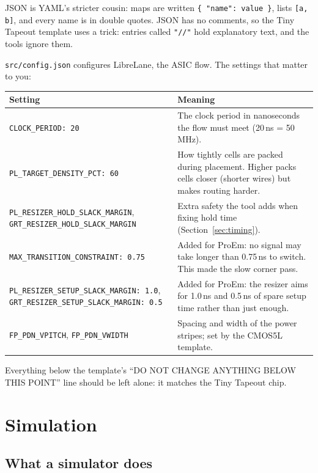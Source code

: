 \documentclass[11pt,a4paper]{article}
\newcommand{\file}[1]{\texttt{#1}}
\begin{document}
JSON is YAML's stricter cousin: maps are written \texttt{\{ "name": value \}}, lists \texttt{[a, b]}, and every name is in double quotes. JSON has no comments, so the Tiny Tapeout template uses a trick: entries called \texttt{"//"} hold explanatory text, and the tools ignore them.

\file{src/config.json} configures LibreLane, the ASIC flow. The settings that matter to you:

\begin{center}
\begin{tabularx}{\linewidth}{@{}lX@{}}
\toprule
Setting & Meaning \\
\midrule
\texttt{CLOCK\_PERIOD: 20} & The clock period in nanoseconds the flow must meet (20\,ns = 50\,MHz). \\
\texttt{PL\_TARGET\_DENSITY\_PCT: 60} & How tightly cells are packed during placement. Higher packs cells closer (shorter wires) but makes routing harder. \\
\texttt{PL\_RESIZER\_HOLD\_SLACK\_MARGIN}, \texttt{GRT\_RESIZER\_HOLD\_SLACK\_MARGIN} & Extra safety the tool adds when fixing hold time (Section~\ref{sec:timing}). \\
\texttt{MAX\_TRANSITION\_CONSTRAINT: 0.75} & Added for ProEm: no signal may take longer than 0.75\,ns to switch. This made the slow corner pass. \\
\texttt{PL\_RESIZER\_SETUP\_SLACK\_MARGIN: 1.0}, \texttt{GRT\_RESIZER\_SETUP\_SLACK\_MARGIN: 0.5} & Added for ProEm: the resizer aims for 1.0\,ns and 0.5\,ns of spare setup time rather than just enough. \\
\texttt{FP\_PDN\_VPITCH}, \texttt{FP\_PDN\_VWIDTH} & Spacing and width of the power stripes; set by the CMOS5L template. \\
\bottomrule
\end{tabularx}
\end{center}

Everything below the template's ``DO NOT CHANGE ANYTHING BELOW THIS POINT'' line should be left alone: it matches the Tiny Tapeout chip.

\section{Simulation}

\subsection{What a simulator does}
\end{document}
